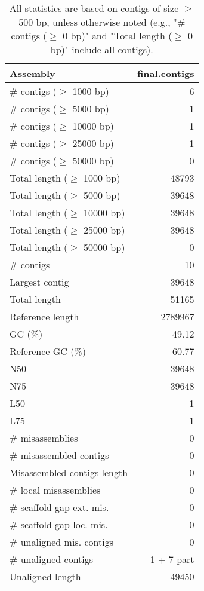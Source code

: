 \documentclass[12pt,a4paper]{article}
\begin{document}
\begin{table}[ht]
\begin{center}
\caption{All statistics are based on contigs of size $\geq$ 500 bp, unless otherwise noted (e.g., "\# contigs ($\geq$ 0 bp)" and "Total length ($\geq$ 0 bp)" include all contigs).}
\begin{tabular}{|l*{1}{|r}|}
\hline
Assembly & final.contigs \\ \hline
\# contigs ($\geq$ 1000 bp) & 6 \\ \hline
\# contigs ($\geq$ 5000 bp) & 1 \\ \hline
\# contigs ($\geq$ 10000 bp) & 1 \\ \hline
\# contigs ($\geq$ 25000 bp) & 1 \\ \hline
\# contigs ($\geq$ 50000 bp) & 0 \\ \hline
Total length ($\geq$ 1000 bp) & 48793 \\ \hline
Total length ($\geq$ 5000 bp) & 39648 \\ \hline
Total length ($\geq$ 10000 bp) & 39648 \\ \hline
Total length ($\geq$ 25000 bp) & 39648 \\ \hline
Total length ($\geq$ 50000 bp) & 0 \\ \hline
\# contigs & 10 \\ \hline
Largest contig & 39648 \\ \hline
Total length & 51165 \\ \hline
Reference length & 2789967 \\ \hline
GC (\%) & 49.12 \\ \hline
Reference GC (\%) & 60.77 \\ \hline
N50 & 39648 \\ \hline
N75 & 39648 \\ \hline
L50 & 1 \\ \hline
L75 & 1 \\ \hline
\# misassemblies & 0 \\ \hline
\# misassembled contigs & 0 \\ \hline
Misassembled contigs length & 0 \\ \hline
\# local misassemblies & 0 \\ \hline
\# scaffold gap ext. mis. & 0 \\ \hline
\# scaffold gap loc. mis. & 0 \\ \hline
\# unaligned mis. contigs & 0 \\ \hline
\# unaligned contigs & 1 + 7 part \\ \hline
Unaligned length & 49450 \\ \hline

\end{tabular}
\end{center}
\end{table}
\end{document}
